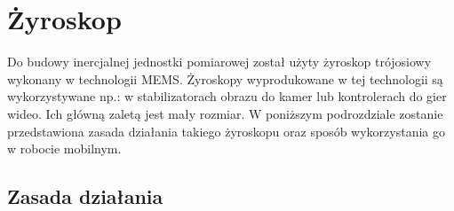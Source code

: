 \section{Żyroskop}
\label{sec:gyro}
Do budowy inercjalnej jednostki pomiarowej został użyty żyroskop trójosiowy
wykonany w technologii MEMS. Żyroskopy wyprodukowane w tej technologii są
wykorzystywane np.: w stabilizatorach obrazu do kamer lub kontrolerach do gier
wideo. Ich główną zaletą jest mały rozmiar. W poniższym podrozdziale zostanie 
przedstawiona zasada działania takiego żyroskopu oraz sposób wykorzystania go w
robocie mobilnym.

\subsection{Zasada działania}

